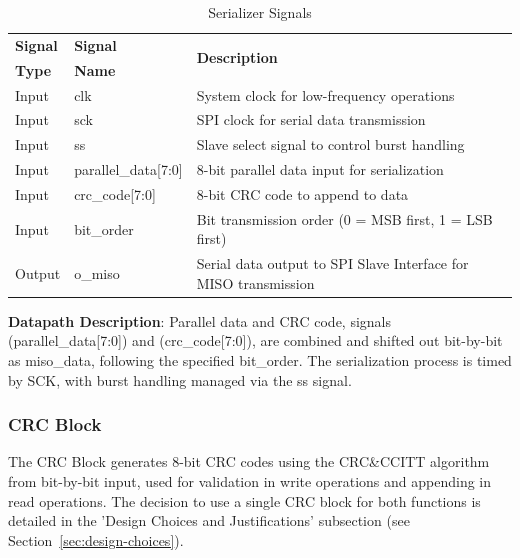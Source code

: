 \begin{table}[!htb]
    \centering
    \caption{Serializer Signals}
    \label{tab:serializer-signals}
    \begin{tabular}{|m{}|m{}|m{}|}
        \hline
        \textbf{Signal} & \textbf{Signal} & \multirow{2}{*}{\textbf{Description}} \\
        \textbf{Type} & \textbf{Name} & \\
        \hline
        Input & clk & System clock for low-frequency operations \\
        Input & sck & SPI clock for serial data transmission \\
        Input & ss & Slave select signal to control burst handling \\
        Input & parallel\_data[7:0] & 8-bit parallel data input for serialization \\
        Input & crc\_code[7:0] & 8-bit CRC code to append to data \\
        Input & bit\_order & Bit transmission order (0 = MSB first, 1 = LSB first) \\
        Output & o\_miso & Serial data output to SPI Slave Interface for MISO transmission \\
        \hline
    \end{tabular}
\end{table}

\textbf{Datapath Description}: Parallel data and CRC code, signals (parallel\_data[7:0]) and (crc\_code[7:0]), are combined and shifted out bit-by-bit as miso\_data, following the specified bit\_order. The serialization process is timed by SCK, with burst handling managed via the ss signal.

\subsubsection{CRC Block}
The CRC Block generates 8-bit CRC codes using the CRC\&CCITT algorithm from bit-by-bit input, used for validation in write operations and appending in read operations. The decision to use a single CRC block for both functions is detailed in the 'Design Choices and Justifications' subsection (see Section~\ref{sec:design-choices}).

